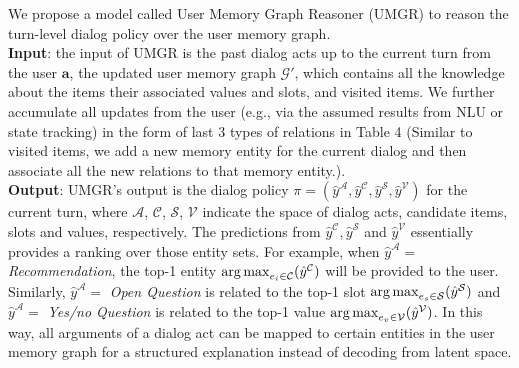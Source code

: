 We propose a model called User Memory Graph Reasoner (UMGR) to reason the turn-level dialog policy over the user memory graph.\\ 
\textbf{Input}: the input of UMGR is the past dialog acts up to the current turn from the user $\boldsymbol{a}$, the updated user memory graph $\mathcal{G}'$, which contains all the knowledge about the items their associated values and slots, and visited items. We further accumulate all updates from the user (e.g., via the assumed results from NLU or state tracking) in the form of last 3 types of relations in Table 4 (Similar to visited items, we add a new memory entity for the current dialog and then associate all the new relations to that memory entity.).\\
\textbf{Output}: UMGR's output is the dialog policy $\pi=(\hat{y}^\mathcal{A}, \hat{y}^\mathcal{C}, \hat{y}^\mathcal{S}, \hat{y}^\mathcal{V})$ for the current turn, where $\mathcal{A}$, $\mathcal{C}$, $\mathcal{S}$, $\mathcal{V}$ indicate the space of dialog acts, candidate items, slots and values, respectively.
The predictions from $\hat{y}^\mathcal{C}, \hat{y}^\mathcal{S}$ and $\hat{y}^\mathcal{V}$ essentially provides a ranking over those entity sets.
For example, when $\hat{y}^\mathcal{A}=$ \textit{Recommendation}, the top-1 entity $\operatorname*{arg\,max}_{e_i \in \mathcal{C}}(\hat{y}^\mathcal{C})$ will be provided to the user.
Similarly, $\hat{y}^\mathcal{A}=$ \textit{Open Question} is related to the top-1 slot $\operatorname*{arg\,max}_{e_s \in \mathcal{S}}(\hat{y}^\mathcal{S})$ and $\hat{y}^\mathcal{A}=$ \textit{Yes/no Question} is related to the top-1 value $\operatorname*{arg\,max}_{e_v \in \mathcal{V}}(\hat{y}^\mathcal{V})$.
In this way, all arguments of a dialog act can be mapped to certain entities in the user memory graph for a structured explanation instead of decoding from latent space.

